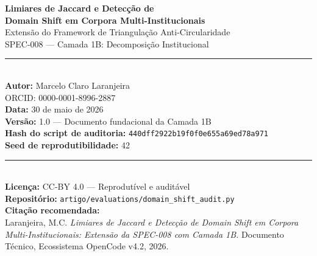 \documentclass[12pt,a4paper]{article}
\theoremstyle{remark}
\begin{document}
\begin{titlepage}
\begin{center}

\vspace*{40pt}

{\LARGE \textbf{Limiares de Jaccard e Detecção de}}\\[8pt]
{\LARGE \textbf{Domain Shift em Corpora Multi-Institucionais}}\\[16pt]

{\large Extensão do Framework de Triangulação Anti-Circularidade}\\[4pt]
{\large SPEC-008 — Camada 1B: Decomposição Institucional}\\[24pt]

\rule{0.65\textwidth}{0.4pt}\\[16pt]

{\normalsize \textbf{Autor:} Marcelo Claro Laranjeira}\\[4pt]
{\normalsize ORCID: 0000-0001-8996-2887}\\[16pt]

{\normalsize \textbf{Data:} 30 de maio de 2026}\\[4pt]
{\normalsize \textbf{Versão:} 1.0 — Documento fundacional da Camada 1B}\\[16pt]

{\footnotesize \textbf{Hash do script de auditoria:} \texttt{440dff2922b19f0f0e655a69ed78a971}}\\[4pt]
{\footnotesize \textbf{Seed de reprodutibilidade:} 42}\\[24pt]

\rule{0.65\textwidth}{0.4pt}\\[16pt]

{\normalsize \textbf{Licença:} CC-BY 4.0 — Reprodutível e auditável}\\[4pt]
{\normalsize \textbf{Repositório:} \texttt{artigo/evaluations/domain\_shift\_audit.py}}\\[40pt]

{\small
  \textbf{Citação recomendada:}\\
  Laranjeira, M.C. \textit{Limiares de Jaccard e Detecção de Domain Shift em Corpora Multi-Institucionais: Extensão da SPEC-008 com Camada 1B.} Documento Técnico, Ecossistema OpenCode v4.2, 2026.
}

\end{center}
\end{titlepage}
\end{document}
